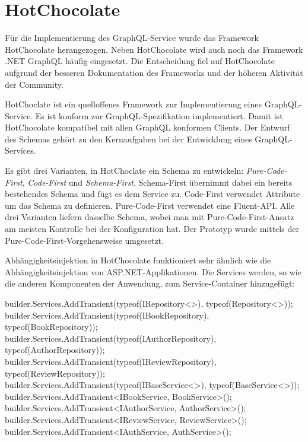\section{HotChocolate}
Für die Implementierung des GraphQL-Service wurde das Framework HotChocolate herangezogen.
Neben HotChocolate wird auch noch das Framework .NET GraphQL häufig eingesetzt.
Die Entscheidung fiel auf HotChocolate aufgrund der besseren Dokumentation des Frameworks und der höheren Aktivität der Community.

HotChoclate ist ein quelloffenes Framework zur Implementierung eines GraphQL-Service.
Es ist konform zur GraphQL-Spezifikation implementiert.
Damit ist HotChocolate kompatibel mit allen GraphQL konformen Clients.
Der Entwurf des Schemas gehört zu den Kernaufgaben bei der Entwicklung eines GraphQL-Services.

Es gibt drei Varianten, in HotChoclate ein Schema zu entwickeln: \textit{Pure-Code-First}, \textit{Code-First} und \textit{Schema-First}.
Schema-First übernimmt dabei ein bereits bestehendes Schema und fügt es dem Service zu.
Code-First verwendet Attribute um das Schema zu definieren.
Pure-Code-First verwendet eine Fluent-API.
Alle drei Varianten liefern dasselbe Schema, wobei man mit Pure-Code-First-Ansatz am meisten Kontrolle bei der Konfiguration hat.
Der Prototyp wurde mittels der Pure-Code-First-Vorgehensweise umgesetzt.

Abhängigkeitsinjektion in HotChocolate funktioniert sehr ähnlich wie die Abhängigkeitsinjektion von ASP.NET-Applikationen.
Die Services werden, so wie die anderen Komponenten der Anwendung, zum Service-Container hinzugefügt:

\begin{JsCode}
builder.Services.AddTransient(typeof(IRepository<>), typeof(Repository<>));
builder.Services.AddTransient(typeof(IBookRepository), typeof(BookRepository));
builder.Services.AddTransient(typeof(IAuthorRepository), typeof(AuthorRepository));
builder.Services.AddTransient(typeof(IReviewRepository), typeof(ReviewRepository));
builder.Services.AddTransient(typeof(IBaseService<>), typeof(BaseService<>));
builder.Services.AddTransient<IBookService, BookService>();
builder.Services.AddTransient<IAuthorService, AuthorService>();
builder.Services.AddTransient<IReviewService, ReviewService>();
builder.Services.AddTransient<IAuthService, AuthService>();
\end{JsCode}

